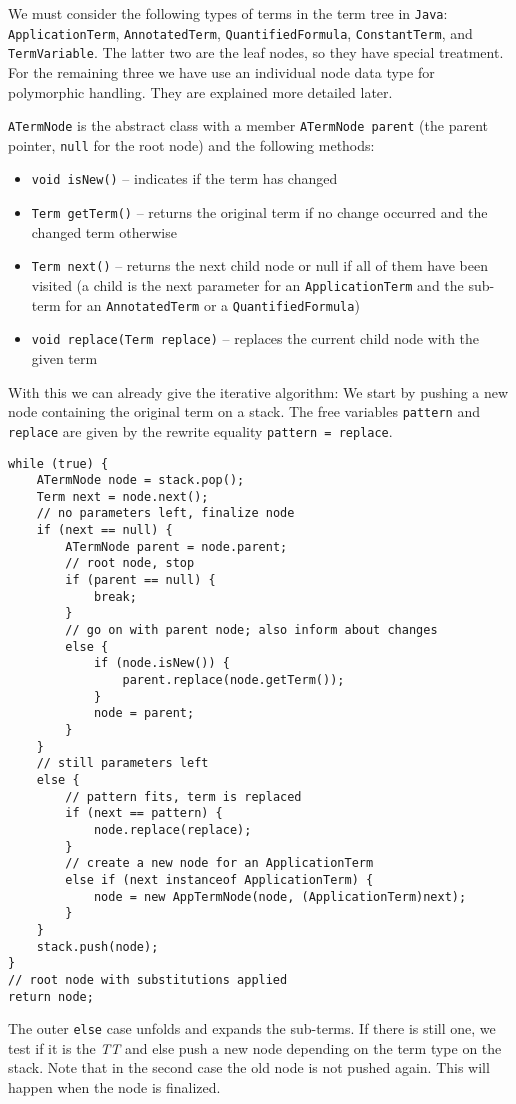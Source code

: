 \documentclass[10pt,a4paper]{article}
\newcommand{\jav}{\texttt{Java}\xspace}
\newcommand{\ttt}{\texttt}
\newcommand{\TTx}{\emph{TT}}
\newcommand{\TT}{\TTx\xspace}
\begin{document}
We must consider the following types of terms in the term tree in \jav: \ttt{ApplicationTerm}, \ttt{AnnotatedTerm}, \ttt{QuantifiedFormula}, \ttt{ConstantTerm}, and \ttt{TermVariable}. The latter two are the leaf nodes, so they have special treatment. For the remaining three we have use an individual node data type for polymorphic handling. They are explained more detailed later.

\ttt{ATermNode} is the abstract class with a member \ttt{ATermNode~parent} (the parent pointer, \ttt{null} for the root node) and the following methods:
%
\begin{itemize}
	\item \ttt{void~isNew()} -- indicates if the term has changed
	\item \ttt{Term~getTerm()} -- returns the original term if no change occurred and the changed term otherwise
	\item \ttt{Term~next()} -- returns the next child node or null if all of them have been visited (a child is the next parameter for an \ttt{ApplicationTerm} and the sub-term for an \ttt{AnnotatedTerm} or a \ttt{QuantifiedFormula})
	\item \ttt{void~replace(Term~replace)} -- replaces the current child node with the given term
\end{itemize}

With this we can already give the iterative algorithm: We start by pushing a new node containing the original term on a stack. The free variables \ttt{pattern} and \ttt{replace} are given by the rewrite equality \ttt{pattern = replace}.
%
\begin{lstlisting}
while (true) {
	ATermNode node = stack.pop();
	Term next = node.next();
	// no parameters left, finalize node
	if (next == null) {
		ATermNode parent = node.parent;
		// root node, stop
		if (parent == null) {
			break;
		}
		// go on with parent node; also inform about changes
		else {
			if (node.isNew()) {
				parent.replace(node.getTerm());
			}
			node = parent;
		}
	}
	// still parameters left
	else {
		// pattern fits, term is replaced
		if (next == pattern) {
			node.replace(replace);
		}
		// create a new node for an ApplicationTerm
		else if (next instanceof ApplicationTerm) {
			node = new AppTermNode(node, (ApplicationTerm)next);
		}
	}
	stack.push(node);
}
// root node with substitutions applied
return node;
\end{lstlisting}

The outer \ttt{else} case unfolds and expands the sub-terms. If there is still one, we test if it is the \TT and else push a new node depending on the term type on the stack. Note that in the second case the old node is not pushed again. This will happen when the node is finalized.
\end{document}
